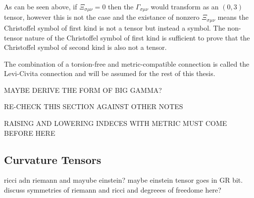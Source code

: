 As can be seen above, if $\Xi_{\sigma\mu\nu}=0$ then the $\Gamma_{\sigma\mu\nu}$ would transform as an $(0,3)$ tensor, however this is not the case and the existance of nonzero $\Xi_{\sigma\mu\nu}$ means the Christoffel symbol of first kind is not a tensor but instead a symbol. The non-tensor nature of the Christoffel symbol of first kind is sufficient to prove that the Christoffel symbol of second kind is also not a tensor.

The combination of a torsion-free and metric-compatible connection is called the Levi-Civita connection and will be assumed for the rest of this thesis.

MAYBE DERIVE THE FORM OF BIG GAMMA?

RE-CHECK THIS SECTION AGAINST OTHER NOTES

RAISING AND LOWERING INDECES WITH METRIC MUST COME BEFORE HERE


\subsection{Curvature Tensors}
ricci adn riemann and mayube einstein? maybe einstein tensor goes in GR bit. discuss symmetries of riemann and ricci and degreees of freedome here?

